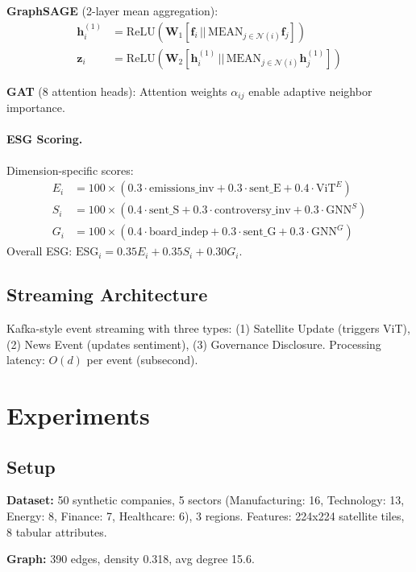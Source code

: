 \documentclass[10pt,twocolumn]{article}
\begin{document}
\textbf{GraphSAGE} (2-layer mean aggregation):
\begin{align}
\mathbf{h}_i^{(1)} &= \text{ReLU}(\mathbf{W}_1 [\mathbf{f}_i \,||\, \text{MEAN}_{j \in \mathcal{N}(i)} \mathbf{f}_j]) \\
\mathbf{z}_i &= \text{ReLU}(\mathbf{W}_2 [\mathbf{h}_i^{(1)} \,||\, \text{MEAN}_{j \in \mathcal{N}(i)} \mathbf{h}_j^{(1)}])
\end{align}

\textbf{GAT} (8 attention heads): Attention weights $\alpha_{ij}$ enable adaptive neighbor importance.

\paragraph{ESG Scoring.} Dimension-specific scores:
\begin{align}
E_i &= 100 \times (0.3 \cdot \text{emissions\_inv} + 0.3 \cdot \text{sent\_E} + 0.4 \cdot \text{ViT}^E) \\
S_i &= 100 \times (0.4 \cdot \text{sent\_S} + 0.3 \cdot \text{controversy\_inv} + 0.3 \cdot \text{GNN}^S) \\
G_i &= 100 \times (0.4 \cdot \text{board\_indep} + 0.3 \cdot \text{sent\_G} + 0.3 \cdot \text{GNN}^G)
\end{align}
Overall ESG: $\text{ESG}_i = 0.35 E_i + 0.35 S_i + 0.30 G_i$.

\subsection{Streaming Architecture}

Kafka-style event streaming with three types: (1) Satellite Update (triggers ViT), (2) News Event (updates sentiment), (3) Governance Disclosure. Processing latency: $O(d)$ per event (subsecond).

\section{Experiments}

\subsection{Setup}

\textbf{Dataset:} 50 synthetic companies, 5 sectors (Manufacturing: 16, Technology: 13, Energy: 8, Finance: 7, Healthcare: 6), 3 regions. Features: 224x224 satellite tiles, 8 tabular attributes.

\textbf{Graph:} 390 edges, density 0.318, avg degree 15.6.
\end{document}
